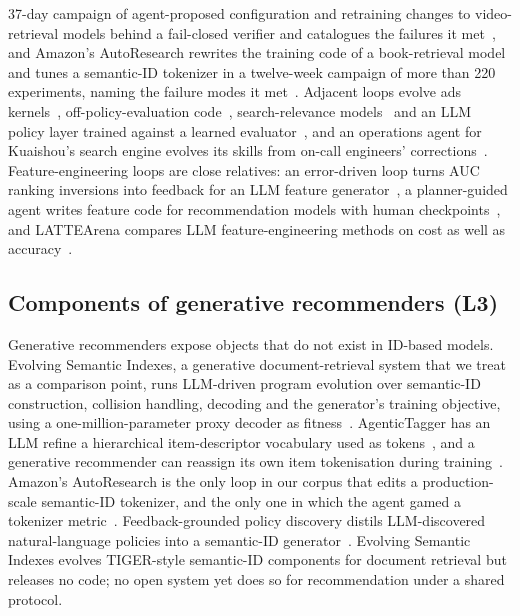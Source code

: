 \documentclass[sigconf,nonacm]{acmart}
\begin{document}
37-day campaign of agent-proposed configuration and retraining changes to video-retrieval models behind a fail-closed
verifier and catalogues the failures it met~\cite{fu2026evopilot}, and Amazon's AutoResearch rewrites the training code
of a book-retrieval model and tunes a semantic-ID tokenizer in a twelve-week campaign of more than 220 experiments, naming the failure modes it
met~\cite{chandran2026autoresearch}. Adjacent loops evolve ads kernels~\cite{kernelevolve2025}, off-policy-evaluation
code~\cite{wu2025growthhacker}, search-relevance models~\cite{wang2026serm} and an LLM policy layer trained against a
learned evaluator~\cite{zhang2026dream}, and an operations agent for Kuaishou's search engine evolves its skills
from on-call engineers' corrections~\cite{liu2026bianque}. Feature-engineering loops are close relatives: an
error-driven loop turns AUC ranking inversions into feedback for an LLM feature generator~\cite{barlier2026feature}, a
planner-guided agent writes feature code for recommendation models with human checkpoints~\cite{thakur2026feature}, and
LATTEArena compares LLM feature-engineering methods on cost as well as accuracy~\cite{hao2026lattearena}.

\subsection{Components of generative recommenders (L3)}
Generative recommenders expose objects that do not exist in ID-based models. Evolving Semantic Indexes, a generative
document-retrieval system that we treat as a comparison point, runs
LLM-driven program evolution over semantic-ID construction, collision handling, decoding and the generator's training
objective, using a one-million-parameter proxy decoder as fitness~\cite{nian2026semanticindex}. AgenticTagger has an
LLM refine a hierarchical item-descriptor vocabulary used as tokens~\cite{xie2026agentictagger}, and a generative
recommender can reassign its own item tokenisation during training~\cite{chen2024tokenization}. Amazon's
AutoResearch is the only loop in our corpus that edits a production-scale semantic-ID tokenizer, and the only one in which the agent
gamed a tokenizer metric~\cite{chandran2026autoresearch}. Feedback-grounded
policy discovery distils LLM-discovered natural-language policies into a semantic-ID generator~\cite{chen2026policydiscovery}.
Evolving Semantic Indexes evolves TIGER-style semantic-ID components for document retrieval but releases no code;
no open system yet does so for recommendation under a shared protocol.
\end{document}
